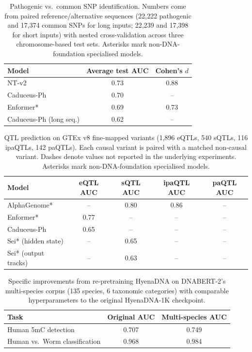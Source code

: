 \documentclass[11pt,a4paper]{article}
\begin{document}
\begin{table}[htbp]
\centering
\small
\caption{Pathogenic vs.\ common SNP identification. Numbers come from paired reference/alternative sequences (22{,}222 pathogenic and 17{,}374 common SNPs for long inputs; 22{,}239 and 17{,}398 for short inputs) with nested cross-validation across three chromosome-based test sets. Asterisks mark non-DNA-foundation specialised models.}
\label{tab:snp}
\begin{tabular}{@{}lcc@{}}
\toprule
Model & Average test AUC & Cohen's $d$ \\
\midrule
NT-v2                 & 0.73 & 0.88 \\
Caduceus-Ph           & 0.70 & -- \\
Enformer*             & 0.69 & 0.73 \\
Caduceus-Ph (long seq.) & 0.62 & -- \\
\bottomrule
\end{tabular}
\end{table}

\begin{table}[htbp]
\centering
\small
\caption{QTL prediction on GTEx v8 fine-mapped variants (1{,}896 eQTLs, 540 sQTLs, 116 ipaQTLs, 142 paQTLs). Each causal variant is paired with a matched non-causal variant. Dashes denote values not reported in the underlying experiments. Asterisks mark non-DNA-foundation specialised models.}
\label{tab:qtl}
\begin{tabular}{@{}lcccc@{}}
\toprule
Model & eQTL AUC & sQTL AUC & ipaQTL AUC & paQTL AUC \\
\midrule
AlphaGenome*           & --   & 0.80 & 0.86 & --   \\
Enformer*              & 0.77 & --   & --   & --   \\
Caduceus-Ph            & 0.65 & --   & --   & --   \\
Sei* (hidden state)    & --   & 0.65 & --   & --   \\
Sei* (output tracks)   & --   & 0.63 & --   & --   \\
\bottomrule
\end{tabular}
\end{table}

\begin{table}[htbp]
\centering
\small
\caption{Specific improvements from re-pretraining HyenaDNA on DNABERT-2's multi-species corpus (135 species, 6 taxonomic categories) with comparable hyperparameters to the original HyenaDNA-1K checkpoint.}
\label{tab:pretraining}
\begin{tabular}{@{}lcc@{}}
\toprule
Task & Original AUC & Multi-species AUC \\
\midrule
Human 5mC detection              & 0.707 & 0.749 \\
Human vs.\ Worm classification   & 0.968 & 0.984 \\
\bottomrule
\end{tabular}
\end{table}
\end{document}
